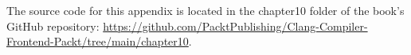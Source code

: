 The source code for this appendix is located in the chapter10 folder of the book's GitHub repository: \url{https://github.com/PacktPublishing/Clang-Compiler-Frontend-Packt/tree/main/chapter10}.
